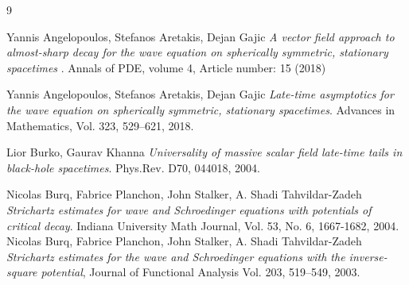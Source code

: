 \documentclass[10pt,a4paper]{article}
\theoremstyle{plain}
\theoremstyle{remark}
\theoremstyle{definition}
\theoremstyle{plain}
\theoremstyle{remark}
\theoremstyle{definition}
\numberwithin{equation}{section}
\begin{document}
\begin{thebibliography}{9}
	
	
	
	
	
	
	
	
	
	
	
	
	
	
	
	
	
	
	
	
	
	
	
	
	
	
	
	
	
	
	
	
	
	
	
	
	
	
	
	
	
	
	
	
	
	
	
	
	
	
	
	
	 Yannis Angelopoulos, Stefanos Aretakis, Dejan Gajic \emph{A vector field approach to almost-sharp decay for the wave equation on spherically symmetric, stationary spacetimes }.
	Annals of PDE, volume 4, Article number: 15 (2018) 
	
	 Yannis Angelopoulos, Stefanos Aretakis, Dejan Gajic \emph{Late-time asymptotics for the wave equation on spherically symmetric, stationary spacetimes}.
	Advances in Mathematics, Vol. 323, 529–621, 2018.
	
	
	
	
	
	 Lior Burko,  Gaurav Khanna \emph{Universality of massive scalar field late-time tails in black-hole spacetimes}.
	Phys.Rev. D70, 044018,  2004.
	
	 Nicolas Burq, Fabrice Planchon, John Stalker, A. Shadi Tahvildar-Zadeh \emph{Strichartz estimates for wave and Schroedinger equations with potentials of critical decay}. Indiana University Math Journal, Vol. 53, No. 6, 1667-1682, 2004.
	 Nicolas Burq, Fabrice Planchon, John Stalker, A. Shadi Tahvildar-Zadeh \emph{Strichartz estimates for the wave and Schroedinger equations with the inverse-square potential}, Journal of Functional Analysis Vol. 203, 519--549, 2003.
	

\end{thebibliography}
\end{document}
